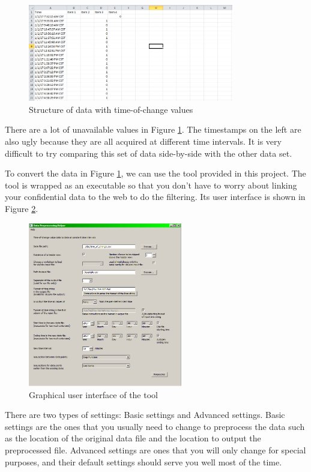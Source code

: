 \documentclass[12pt,a4paper]{article}
\begin{document}
\begin{figure}[H]
\centering
\includegraphics[width=0.8\textwidth]{time-of-change.png}
\caption{Structure of data with time-of-change values}
\label{fig:ugly_file}
\end{figure}

There are a lot of unavailable values in Figure \ref{fig:ugly_file}.
The timestamps on the left are also ugly because they are all acquired at different time intervals.
It is very difficult to try comparing this set of data side-by-side with the other data set.

To convert the data in Figure \ref{fig:ugly_file}, we can use the tool provided in this project.
The tool is wrapped as an executable so that you don't have to worry about linking your confidential data to the web to do the filtering.
Its user interface is shown in Figure \ref{fig:ui}.

\begin{figure}[H]
\centering
\includegraphics[width=0.6\textwidth]{ui.png}
\caption{Graphical user interface of the tool}
\label{fig:ui}
\end{figure}

There are two types of settings: Basic settings and Advanced settings. Basic settings are the ones that you usually need to change to preprocess the data such as the location of the original data file and the location to output the preprocessed file.
Advanced settings are ones that you will only change for special purposes, and their default settings should serve you well most of the time.
\end{document}
